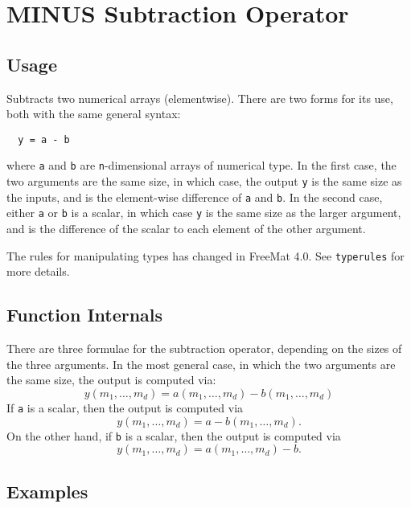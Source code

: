 \section{MINUS Subtraction Operator}

\subsection{Usage}

Subtracts two numerical arrays (elementwise).  There are two forms
for its use, both with the same general syntax:
\begin{verbatim}
  y = a - b
\end{verbatim}
where \verb|a| and \verb|b| are \verb|n|-dimensional arrays of numerical type.  In the
first case, the two arguments are the same size, in which case, the 
output \verb|y| is the same size as the inputs, and is the element-wise
difference of \verb|a| and \verb|b|.  In the second case, either \verb|a| or \verb|b| is a scalar, 
in which case \verb|y| is the same size as the larger argument,
and is the difference of the scalar to each element of the other argument.

The rules for manipulating types has changed in FreeMat 4.0.  See \verb|typerules|
for more details.

\subsection{Function Internals}

There are three formulae for the subtraction operator, depending on the
sizes of the three arguments.  In the most general case, in which 
the two arguments are the same size, the output is computed via:
\[
y(m_1,\ldots,m_d) = a(m_1,\ldots,m_d) - b(m_1,\ldots,m_d)
\]
If \verb|a| is a scalar, then the output is computed via
\[
y(m_1,\ldots,m_d) = a - b(m_1,\ldots,m_d).
\]
On the other hand, if \verb|b| is a scalar, then the output is computed via
\[
y(m_1,\ldots,m_d) = a(m_1,\ldots,m_d) - b.
\]
\subsection{Examples}

